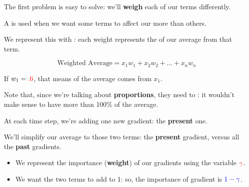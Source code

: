             The first problem is easy to solve: we'll \textbf{weigh} each of our terms differently.\\
            
            \begin{concept}
                A  is used when we want some terms to affect our  more than others.
                
                We represent this with : each weight represents the  of our average from that term.
                
                \begin{equation*}
                    \text{Weighted Average} =
                    x_1w_1 + x_2w_2 + \dots + x_nw_n
                \end{equation*}
            \end{concept}

            
            \miniex If $w_1=\textcolor{red}{.6}$, that means  of the average comes from $x_1$.
            
            Note that, since we're talking about \textbf{proportions}, they need to : it wouldn't make sense to have more than 100\% of the average.
            
            At each time step, we're adding one new gradient: the \textbf{present} one.
            
            We'll simplify our average to those two terms: the \textbf{present} gradient, versus all the \textbf{past} gradients.
            
            \begin{itemize}
                \item We represent the importance (\textbf{weight}) of our  gradients using the variable $\textcolor{red}{\gamma}$.
                
                \item We want the two terms to add to 1: so, the importance of  gradient is $\textcolor{blue}{1-\gamma}$.
            \end{itemize}
            
